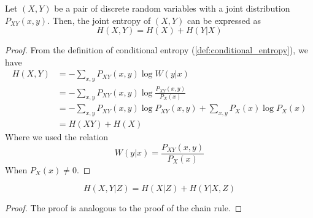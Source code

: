 \begin{theorem}\label{thm:chain_rule}
     Let $(X,Y)$ be a pair of discrete random variables with a joint distribution $P_{XY}(x,y)$. Then, the joint entropy of $(X,Y)$ can be expressed as 
    \begin{equation}
        H(X,Y) = H(X) + H(Y|X)
    \end{equation}
\end{theorem}
\begin{proof}
    From the definition of conditional entropy (\ref{def:conditional_entropy}), we have
    \begin{align*}
        H(X,Y) &= -\sum_{x,y} P_{XY}(x,y) \log W(y|x) \\
        &= -\sum_{x,y} P_{XY}(x,y) \log \frac{P_{XY}(x,y)}{P_X(x)} \\
        &= -\sum_{x,y} P_{XY}(x,y) \log P_{XY}(x,y) + \sum_{x,y} P_{X}(x) \log P_X(x) \\
        &= H(XY) + H(X)
    \end{align*}
    Where we used the relation
    \begin{equation}
        W(y|x) = \frac{P_{XY}(x,y)}{P_X(x)}
    \end{equation}
    When $P_X(x) \neq 0$.
\end{proof}

\begin{corollary}
    \begin{equation}
        H(X, Y|Z) = H(X|Z) + H(Y|X,Z)
    \end{equation}
\end{corollary}
\begin{proof}
    The proof is analogous to the proof of the chain rule.
\end{proof}






































